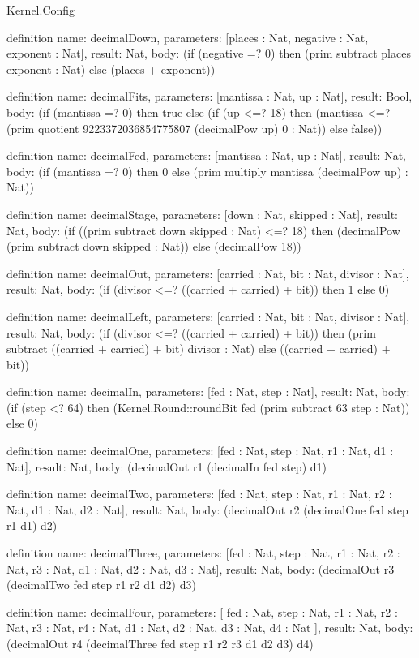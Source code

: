 \begin{lexlean}{Kernel.Config}
\begin{semanticmodule}
definition{
  name: decimalDown,
  parameters: [places : Nat, negative : Nat, exponent : Nat],
  result: Nat,
  body: (if (negative =? 0) then (prim subtract places exponent : Nat) else (places + exponent))
}

definition{
  name: decimalFits,
  parameters: [mantissa : Nat, up : Nat],
  result: Bool,
  body: (if (mantissa =? 0) then true else (if (up <=? 18) then (mantissa <=? (prim quotient 9223372036854775807 (decimalPow up) 0 : Nat)) else false))
}

definition{
  name: decimalFed,
  parameters: [mantissa : Nat, up : Nat],
  result: Nat,
  body: (if (mantissa =? 0) then 0 else (prim multiply mantissa (decimalPow up) : Nat))
}

definition{
  name: decimalStage,
  parameters: [down : Nat, skipped : Nat],
  result: Nat,
  body: (if ((prim subtract down skipped : Nat) <=? 18) then (decimalPow (prim subtract down skipped : Nat)) else (decimalPow 18))
}

definition{
  name: decimalOut,
  parameters: [carried : Nat, bit : Nat, divisor : Nat],
  result: Nat,
  body: (if (divisor <=? ((carried + carried) + bit)) then 1 else 0)
}

definition{
  name: decimalLeft,
  parameters: [carried : Nat, bit : Nat, divisor : Nat],
  result: Nat,
  body: (if (divisor <=? ((carried + carried) + bit)) then (prim subtract ((carried + carried) + bit) divisor : Nat) else ((carried + carried) + bit))
}

definition{
  name: decimalIn,
  parameters: [fed : Nat, step : Nat],
  result: Nat,
  body: (if (step <? 64) then (Kernel.Round::roundBit fed (prim subtract 63 step : Nat)) else 0)
}

definition{
  name: decimalOne,
  parameters: [fed : Nat, step : Nat, r1 : Nat, d1 : Nat],
  result: Nat,
  body: (decimalOut r1 (decimalIn fed step) d1)
}

definition{
  name: decimalTwo,
  parameters: [fed : Nat, step : Nat, r1 : Nat, r2 : Nat, d1 : Nat, d2 : Nat],
  result: Nat,
  body: (decimalOut r2 (decimalOne fed step r1 d1) d2)
}

definition{
  name: decimalThree,
  parameters: [fed : Nat, step : Nat, r1 : Nat, r2 : Nat, r3 : Nat, d1 : Nat, d2 : Nat, d3 : Nat],
  result: Nat,
  body: (decimalOut r3 (decimalTwo fed step r1 r2 d1 d2) d3)
}

definition{
  name: decimalFour,
  parameters: [
    fed : Nat,
    step : Nat,
    r1 : Nat,
    r2 : Nat,
    r3 : Nat,
    r4 : Nat,
    d1 : Nat,
    d2 : Nat,
    d3 : Nat,
    d4 : Nat
  ],
  result: Nat,
  body: (decimalOut r4 (decimalThree fed step r1 r2 r3 d1 d2 d3) d4)
}


\end{semanticmodule}
\end{lexlean}
